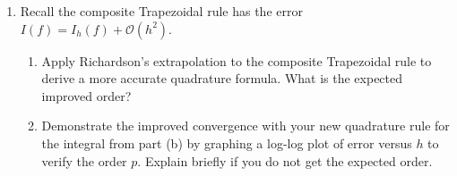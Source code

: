 \documentclass{report}
\begin{document}
{\begin{enumerate}[label=(\alph*)]
\begin{enumerate}[label=(\roman*)]
		      \end{enumerate}
		\item Recall the composite Trapezoidal rule has the error $I(f)=I_{h}(f)+\mathcal{O}\left(h^{2}\right)$.\\
		      \begin{enumerate}[label=(\roman*)]
			      \item Apply Richardson's extrapolation to the composite Trapezoidal rule to derive a more accurate quadrature formula. What is the expected improved order?\\
			      \item Demonstrate the improved convergence with your new quadrature rule for the integral from part (b) by graphing a log-log plot of error versus $h$ to verify the order $p$. Explain briefly if you do not get the expected order.
		      \end{enumerate}

	\end{enumerate}
}
\end{document}
